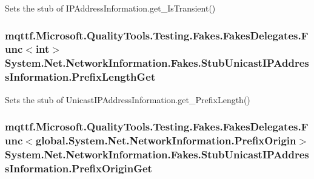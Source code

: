 Sets the stub of I\-P\-Address\-Information.\-get\-\_\-\-Is\-Transient()

\hypertarget{class_system_1_1_net_1_1_network_information_1_1_fakes_1_1_stub_unicast_i_p_address_information_a111aec9d9467caef4765153ddef4436d}{
\subsubsection[{Prefix\-Length\-Get}]{\setlength{\rightskip}{0pt plus 5cm}mqttf.\-Microsoft.\-Quality\-Tools.\-Testing.\-Fakes.\-Fakes\-Delegates.\-Func$<$int$>$ System.\-Net.\-Network\-Information.\-Fakes.\-Stub\-Unicast\-I\-P\-Address\-Information.\-Prefix\-Length\-Get}}\label{class_system_1_1_net_1_1_network_information_1_1_fakes_1_1_stub_unicast_i_p_address_information_a111aec9d9467caef4765153ddef4436d}


Sets the stub of Unicast\-I\-P\-Address\-Information.\-get\-\_\-\-Prefix\-Length()

\hypertarget{class_system_1_1_net_1_1_network_information_1_1_fakes_1_1_stub_unicast_i_p_address_information_a7c03655fc9b3841457b9a5eb790859cc}{
\subsubsection[{Prefix\-Origin\-Get}]{\setlength{\rightskip}{0pt plus 5cm}mqttf.\-Microsoft.\-Quality\-Tools.\-Testing.\-Fakes.\-Fakes\-Delegates.\-Func$<$global.\-System.\-Net.\-Network\-Information.\-Prefix\-Origin$>$ System.\-Net.\-Network\-Information.\-Fakes.\-Stub\-Unicast\-I\-P\-Address\-Information.\-Prefix\-Origin\-Get}}\label{class_system_1_1_net_1_1_network_information_1_1_fakes_1_1_stub_unicast_i_p_address_information_a7c03655fc9b3841457b9a5eb790859cc}


